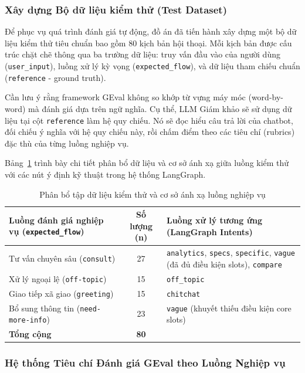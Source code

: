 \subsubsection{Xây dựng Bộ dữ liệu kiểm thử (Test Dataset)}

Để phục vụ quá trình đánh giá tự động, đồ án đã tiến hành xây dựng một bộ dữ liệu kiểm thử tiêu chuẩn bao gồm 80 kịch bản hội thoại. Mỗi kịch bản được cấu trúc chặt chẽ thông qua ba trường dữ liệu: truy vấn đầu vào của người dùng (\texttt{user\_input}), luồng xử lý kỳ vọng (\texttt{expected\_flow}), và dữ liệu tham chiếu chuẩn (\texttt{reference} - ground truth). 

Cần lưu ý rằng framework GEval không so khớp từ vựng máy móc (word-by-word) mà đánh giá dựa trên ngữ nghĩa. Cụ thể, LLM Giám khảo sẽ sử dụng dữ liệu tại cột \texttt{reference} làm hệ quy chiếu. Nó sẽ đọc hiểu câu trả lời của chatbot, đối chiếu ý nghĩa với hệ quy chiếu này, rồi chấm điểm theo các tiêu chí (rubrics) đặc thù của từng luồng nghiệp vụ.

Bảng~\ref{tab:test-dataset-mapping} trình bày chi tiết phân bổ dữ liệu và cơ sở ánh xạ giữa luồng kiểm thử với các nút ý định kỹ thuật trong hệ thống LangGraph.

\begin{table}[H]
\centering
\caption{Phân bổ tập dữ liệu kiểm thử và cơ sở ánh xạ luồng nghiệp vụ}
\label{tab:test-dataset-mapping}
\renewcommand{\arraystretch}{1.3}
\begin{tabular}{|p{}|c|p{}|}
\hline
\textbf{Luồng đánh giá nghiệp vụ (\texttt{expected\_flow})} & \textbf{Số lượng (n)} & \textbf{Luồng xử lý tương ứng (LangGraph Intents)} \\
\hline
Tư vấn chuyên sâu (\texttt{consult}) & 27 & \texttt{analytics}, \texttt{specs}, \texttt{specific}, \texttt{vague} (đã đủ điều kiện slots), \texttt{compare} \\
\hline
Xử lý ngoại lệ (\texttt{off-topic}) & 15 & \texttt{off\_topic} \\
\hline
Giao tiếp xã giao (\texttt{greeting}) & 15 & \texttt{chitchat} \\
\hline
Bổ sung thông tin (\texttt{need-more-info}) & 23 & \texttt{vague} (khuyết thiếu điều kiện core slots) \\
\hline
\textbf{Tổng cộng} & \textbf{80} & \\
\hline
\end{tabular}
\end{table}

\subsubsection{Hệ thống Tiêu chí Đánh giá GEval theo Luồng Nghiệp vụ}

